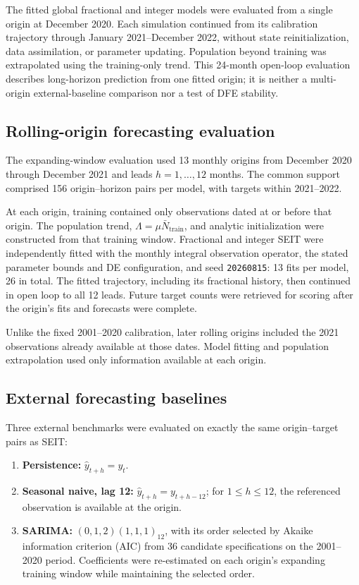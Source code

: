 \documentclass[pdflatex,sn-mathphys-ay]{sn-jnl}
\begin{document}
The fitted global fractional and integer models were evaluated from a single origin at December 2020. Each simulation continued from its calibration trajectory through January 2021--December 2022, without state reinitialization, data assimilation, or parameter updating. Population beyond training was extrapolated using the training-only trend. This 24-month open-loop evaluation describes long-horizon prediction from one fitted origin; it is neither a multi-origin external-baseline comparison nor a test of DFE stability.

\subsection{Rolling-origin forecasting evaluation}

The expanding-window evaluation used 13 monthly origins from December 2020 through December 2021 and leads $h=1,\ldots,12$ months. The common support comprised 156 origin--horizon pairs per model, with targets within 2021--2022.

At each origin, training contained only observations dated at or before that origin. The population trend, $\Lambda=\mu\bar N_{\mathrm{train}}$, and analytic initialization were constructed from that training window. Fractional and integer SEIT were independently fitted with the monthly integral observation operator, the stated parameter bounds and DE configuration, and seed \texttt{20260815}: 13 fits per model, 26 in total. The fitted trajectory, including its fractional history, then continued in open loop to all 12 leads. Future target counts were retrieved for scoring after the origin's fits and forecasts were complete.

Unlike the fixed 2001--2020 calibration, later rolling origins included the 2021 observations already available at those dates. Model fitting and population extrapolation used only information available at each origin.

\subsection{External forecasting baselines}

Three external benchmarks were evaluated on exactly the same origin--target pairs as SEIT:

\begin{enumerate}
\item \textbf{Persistence:} $\widehat y_{t+h}=y_t$.
\item \textbf{Seasonal naive, lag 12:} $\widehat y_{t+h}=y_{t+h-12}$; for $1\le h\le12$, the referenced observation is available at the origin.
\item \textbf{SARIMA:} $(0,1,2)(1,1,1)_{12}$, with its order selected by Akaike information criterion (AIC) from 36 candidate specifications on the 2001--2020 period. Coefficients were re-estimated on each origin's expanding training window while maintaining the selected order.
\end{enumerate}
\end{document}
